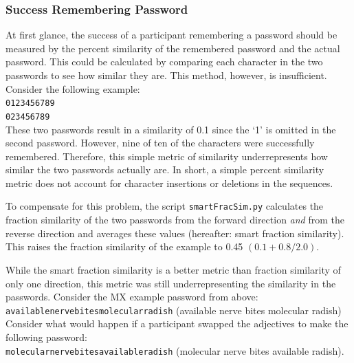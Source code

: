 \documentclass{article}
\begin{document}
\subsubsection*{Success Remembering Password}
At first glance, the success of a participant remembering a password should be measured by the percent similarity of the remembered password and the actual password. This could be calculated by comparing each character in the two passwords to see how similar they are. This method, however, is insufficient. Consider the following example:\\


\noindent\texttt{0123456789}\\
\texttt{023456789} \\

These two passwords result in a similarity of 0.1 since the `1' is omitted in the second password. However, nine of ten of the characters were successfully remembered. Therefore, this simple metric of similarity underrepresents how similar the two passwords actually are. In short, a simple percent similarity metric does not account for character insertions or deletions in the sequences.

To compensate for this problem, the script \texttt{smartFracSim.py} calculates the fraction similarity of the two passwords from the forward direction \emph{and} from the reverse direction and averages these values (hereafter: smart fraction similarity). This raises the fraction similarity of the example to 0.45 $(0.1 + 0.8 / 2.0)$.

While the smart fraction similarity is a better metric than fraction similarity of only one direction, this metric was still underrepresenting the similarity in the passwords. Consider the MX example password from above: \\

\noindent \texttt{availablenervebitesmolecularradish} (available nerve bites molecular radish) \\

Consider what would happen if a participant swapped the adjectives to make the following password:\\

\noindent \texttt{molecularnervebitesavailableradish} (molecular nerve bites available radish). \\
\end{document}
